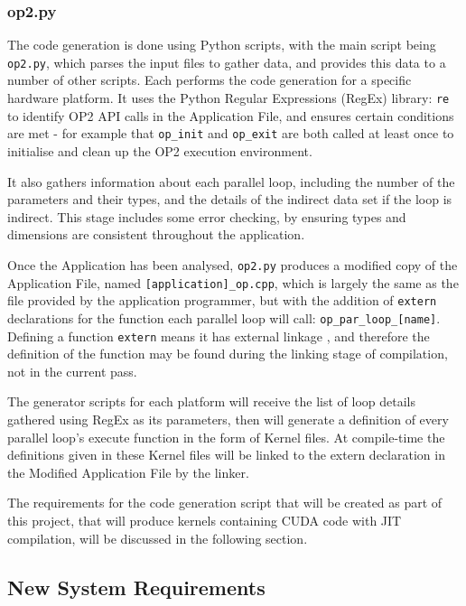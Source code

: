 \subsubsection{op2.py}
\label{ss:impl_op2}
The code generation is done using Python scripts, with the main script being \verb|op2.py|, which parses the input files to gather data, and provides this data to a number of other scripts. Each performs the code generation for a specific hardware platform. It uses the Python Regular Expressions (RegEx) library: \verb|re| \cite{re} to identify OP2 API calls in the Application File, and ensures certain conditions are met - for example that \verb|op_init| and \verb|op_exit| are both called at least once to initialise and clean up the OP2 execution environment.
\par
It also gathers information about each parallel loop, including the number of the parameters and their types, and the details of the indirect data set if the loop is indirect. This stage includes some error checking, by ensuring types and dimensions are consistent throughout the application.
\par
Once the Application has been analysed, \verb|op2.py| produces a modified copy of the Application File, named \verb|[application]_op.cpp|, which is largely the same as the file provided by the application programmer, but with the addition of \verb|extern| declarations for the function each parallel loop will call: \verb|op_par_loop_[name]|. Defining a function \verb|extern| means it has external linkage \cite{linkage}, and therefore the definition of the function may be found during the linking stage of compilation, not in the current pass.
\par
The generator scripts for each platform will receive the list of loop details gathered using RegEx as its parameters, then will generate a definition of every parallel loop's execute function in the form of Kernel files. At compile-time the definitions given in these Kernel files will be linked to the extern declaration in the Modified Application File by the linker.
\par
The requirements for the code generation script that will be created as part of this project, that will produce kernels containing CUDA code with JIT compilation, will be discussed in the following section.

\subsection{New System Requirements}
\label{ss:reqs}

